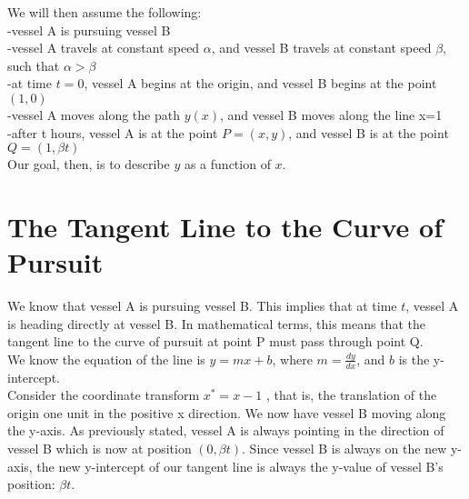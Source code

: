 \documentclass[12pt]{article}
\begin{document}
	We will then assume the following: \\
	\indent \indent -vessel A is pursuing vessel B\\
	\indent \indent -vessel A travels at constant speed $\alpha$, and vessel B travels at constant speed $\beta$, such that $\alpha > \beta$\\
	\indent \indent -at time $t=0$, vessel A begins at the origin, and vessel B begins at the point $(1,0)$\\
	\indent \indent -vessel A moves along the path $y(x)$, and vessel B moves along the line x=1\\
	\indent \indent -after t hours, vessel A is at the point $P=(x,y)$, and vessel B is at the point $Q=(1,\beta t)$\\
	\indent Our goal, then, is to describe $y$ as a function of $x$.\\
	
	\section{The Tangent Line to the Curve of Pursuit}
	
	\indent \indent We know that vessel A is pursuing vessel B. This implies that at time $t$, vessel A is heading directly at vessel B. In mathematical terms, this means that the tangent line to the curve of pursuit at point P must pass through point Q. 
	\\
	
	We know the equation of the line is $y=mx+b$, where $m=\frac{dy}{dx}$, and $b$ is the y-intercept.
	\\
	
	Consider the coordinate transform $x^{*}=x-1$ , that is, the translation of the origin one unit in the positive x direction. We now have vessel B moving along the y-axis. As previously stated, vessel A is always pointing in the direction of vessel B which is now at position $(0,\beta t)$. Since vessel B is always on the new y-axis, the new y-intercept of our tangent line is always the y-value of vessel B's position: $\beta t$.
	\\
	
\end{document}
